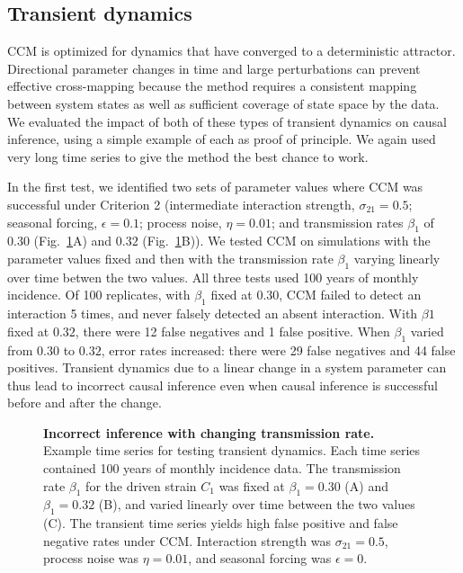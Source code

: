 \documentclass[10pt,letterpaper]{article}
\begin{document}
\subsection*{Transient dynamics}
CCM is optimized for dynamics that have converged to a deterministic attractor.
Directional parameter changes in time and large perturbations can prevent effective cross-mapping because the method requires a consistent mapping between system states as well as sufficient coverage of state space by the data.
We evaluated the impact of both of these types of transient dynamics on causal inference, using a simple example of each as proof of principle.
We again used very long time series to give the method the best chance to work.

In the first test, we identified two sets of parameter values where CCM was successful under Criterion 2 (intermediate interaction strength, $\sigma_{21} = 0.5$; seasonal forcing, $\epsilon = 0.1$; process noise, $\eta = 0.01$; and transmission rates $\beta_1$ of $0.30$ (Fig.~\ref{fig:betachange}A) and $0.32$ (Fig.~\ref{fig:betachange}B)).
We tested CCM on simulations with the parameter values fixed and then with the transmission rate $\beta_1$ varying linearly over time betwen the two values.
All three tests used 100 years of monthly incidence.
Of 100 replicates, with $\beta_1$ fixed at $0.30$, CCM failed to detect an interaction 5 times, and never falsely detected an absent interaction.
With $\beta1$ fixed at $0.32$, there were 12 false negatives and 1 false positive.
When $\beta_1$ varied from $0.30$ to $0.32$, error rates increased: there were 29 false negatives and 44 false positives.
Transient dynamics due to a linear change in a system parameter can thus lead to incorrect causal inference even when causal inference is successful before and after the change.

\begin{figure}
    \caption{\textbf{Incorrect inference with changing transmission rate.} Example time series for testing transient dynamics. Each time series contained 100 years of monthly incidence data. The transmission rate $\beta_1$ for the driven strain $C_1$ was fixed at $\beta_1 = 0.30$ (A) and $\beta_1 = 0.32$ (B), and varied linearly over time between the two values (C). The transient time series yields high false positive and false negative rates under CCM. Interaction strength was $\sigma_{21} = 0.5$, process noise was $\eta = 0.01$, and seasonal forcing was $\epsilon = 0$. \label{fig:betachange}} 
\end{figure}
\end{document}
